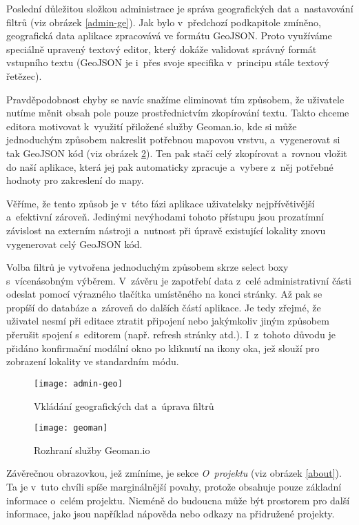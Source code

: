 Poslední důležitou složkou administrace je správa geografických dat a~nastavování filtrů (viz obrázek \ref{admin-ge}). Jak bylo v~předchozí podkapitole zmíněno, geografická data aplikace zpracovává ve formátu GeoJSON. Proto využíváme speciálně upravený textový editor, který dokáže validovat správný formát vstupního textu (GeoJSON je i~přes svoje specifika v~principu stále textový řetězec).

Pravděpodobnost chyby se navíc snažíme eliminovat tím způsobem, že uživatele nutíme měnit obsah pole pouze prostřednictvím zkopírování textu. Takto chceme editora motivovat k~využití přiložené služby Geoman.io, kde si může jednoduchým způsobem nakreslit potřebnou mapovou vrstvu, a~vygenerovat si tak GeoJSON kód (viz obrázek \ref{geoman}). Ten pak stačí celý zkopírovat a~rovnou vložit do naší aplikace, která jej pak automaticky zpracuje a~vybere z~něj potřebné hodnoty pro zakreslení do mapy.

Věříme, že tento způsob je v~této fázi aplikace uživatelsky nejpřívětivější a~efektivní zároveň. Jedinými nevýhodami tohoto přístupu jsou prozatímní závislost na externím nástroji a~nutnost při úpravě existující lokality znovu vygenerovat celý GeoJSON kód.

Volba filtrů je vytvořena jednoduchým způsobem skrze select boxy s~vícenásobným výběrem. V~závěru je zapotřebí data z~celé administrativní části odeslat pomocí výrazného tlačítka umístěného na konci stránky. Až pak se propíší do databáze a~zároveň do dalších částí aplikace. Je tedy zřejmé, že uživatel nesmí při editace ztratit připojení nebo jakýmkoliv jiným způsobem přerušit spojení s~editorem (např. refresh stránky atd.). I~z~tohoto důvodu je přidáno konfirmační modální okno po kliknutí na ikony oka, jež slouží pro zobrazení lokality ve standardním módu.

\begin{figure}
    \centering
    \texttt{[image: admin-geo]}  
    \caption{Vkládání geografických dat a~úprava filtrů}
    \label{admin-geo}
\end{figure}

\begin{figure}
    \centering
    \texttt{[image: geoman]}  
    \caption{Rozhraní služby Geoman.io}
    \label{geoman}
\end{figure}

Závěrečnou obrazovkou, jež zmíníme, je sekce \emph{O~projektu} (viz obrázek \ref{about}). Ta je v~tuto chvíli spíše marginálnější povahy, protože obsahuje pouze základní informace o~celém projektu. Nicméně do budoucna může být prostorem pro další informace, jako jsou například nápověda nebo odkazy na přidružené projekty.

